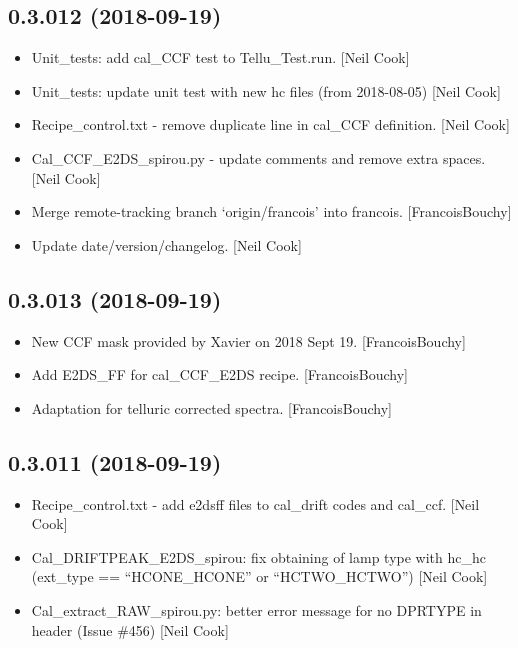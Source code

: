 \documentclass[a4paper,10pt,english]{report}
\begin{document}
\subsection{0.3.012 (2018-09-19)}
\label{\detokenize{misc/changelog:id316}}\begin{itemize}
\item {} 
Unit\_tests: add cal\_CCF test to Tellu\_Test.run. {[}Neil Cook{]}

\item {} 
Unit\_tests: update unit test with new hc files (from 2018-08-05) {[}Neil
Cook{]}

\item {} 
Recipe\_control.txt - remove duplicate line in cal\_CCF definition.
{[}Neil Cook{]}

\item {} 
Cal\_CCF\_E2DS\_spirou.py - update comments and remove extra spaces.
{[}Neil Cook{]}

\item {} 
Merge remote-tracking branch ‘origin/francois’ into francois.
{[}FrancoisBouchy{]}

\item {} 
Update date/version/changelog. {[}Neil Cook{]}

\end{itemize}


\subsection{0.3.013 (2018-09-19)}
\label{\detokenize{misc/changelog:id317}}\begin{itemize}
\item {} 
New CCF mask provided by Xavier on 2018 Sept 19. {[}FrancoisBouchy{]}

\item {} 
Add E2DS\_FF for cal\_CCF\_E2DS recipe. {[}FrancoisBouchy{]}

\item {} 
Adaptation for telluric corrected spectra. {[}FrancoisBouchy{]}

\end{itemize}


\subsection{0.3.011 (2018-09-19)}
\label{\detokenize{misc/changelog:id318}}\begin{itemize}
\item {} 
Recipe\_control.txt - add e2dsff files to cal\_drift codes and cal\_ccf.
{[}Neil Cook{]}

\item {} 
Cal\_DRIFTPEAK\_E2DS\_spirou: fix obtaining of lamp type with hc\_hc
(ext\_type == “HCONE\_HCONE” or “HCTWO\_HCTWO”) {[}Neil Cook{]}

\item {} 
Cal\_extract\_RAW\_spirou.py: better error message for no DPRTYPE in
header (Issue \#456) {[}Neil Cook{]}

\end{itemize}
\end{document}
